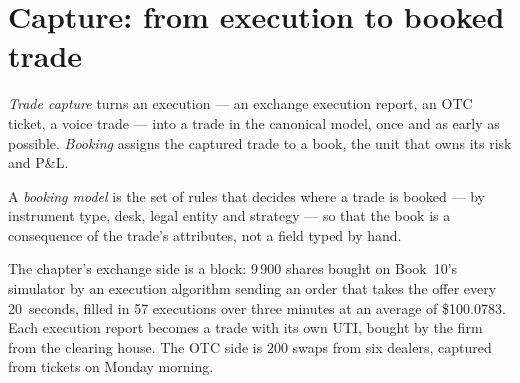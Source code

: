 \section{Capture: from execution to booked trade}

\begin{definition}\label{def:pl:trade-capture-and-booking:capture}
\emph{Trade capture} turns an execution --- an exchange execution report, an OTC ticket, a voice trade --- into a trade
in the canonical model, once and as early as possible. \emph{Booking} assigns the captured trade to a book, the unit that owns
its risk and P\&L.
\end{definition}

\begin{definition}\label{def:pl:trade-capture-and-booking:model}
A \emph{booking model} is the set of rules that decides where a trade is booked --- by instrument type, desk, legal
entity and strategy --- so that the book is a consequence of the trade's attributes, not a field typed by hand.
\end{definition}

The chapter's exchange side is a block: 9\,900 shares bought on Book~10's simulator by an execution algorithm sending an order that takes the
offer every 20~seconds, filled in 57 executions over three minutes at an average of \$100.0783. Each execution report becomes a trade with its
own UTI, bought by the firm from the clearing house. The OTC side is 200 swaps from six dealers, captured from tickets on Monday morning.

\begin{omfigure}

\label{fig:pl:trade-capture-and-booking:block}
\end{omfigure}

